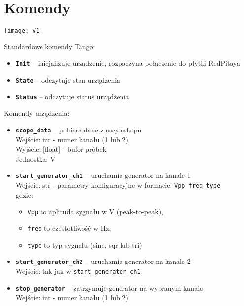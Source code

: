 \documentclass[12pt,a4paper]{article}
\newcommand{\screenshot}[1]{\begin{minipage}[c]{\textwidth}\texttt{[image: \#1]}\end{minipage}}
\begin{document}
	\section{Komendy}
	\screenshot{screenshots/commands.png}
	Standardowe komendy Tango:
	\begin{itemize}
		\item \textbf{\texttt{Init}} -- inicjalizuje urządzenie, rozpoczyna połączenie do płytki RedPitaya
		\item \textbf{\texttt{State}} -- odczytuje stan urządzenia
		\item \textbf{\texttt{Status}} -- odczytuje status urządzenia
	\end{itemize}
	Komendy urządzenia:
	\begin{itemize}
		\item \textbf{\texttt{scope\_data}} -- pobiera dane z oscyloskopu\\
			  Wejście: int - numer kanału (1 lub 2)\\
			  Wyjście: [float] - bufor próbek\\
			  Jednostka: V\\
		\item \textbf{\texttt{start\_generator\_ch1}} -- uruchamia generator na kanale 1\\
			  Wejście: str - parametry konfiguracyjne w formacie: \texttt{Vpp freq type}\\
			  gdzie:
			  \begin{itemize}
			  	\item \texttt{Vpp} to aplituda sygnału w V (peak-to-peak),
			  	\item \texttt{freq} to częstotliwość w Hz,
			  	\item \texttt{type} to typ sygnału (sine, sqr lub tri)
			  \end{itemize}
		\item \textbf{\texttt{start\_generator\_ch2}} -- uruchamia generator na kanale 2\\
			  Wejście: tak jak w \texttt{start\_generator\_ch1}
		\item \textbf{\texttt{stop\_generator}} -- zatrzymuje generator na wybranym kanale\\
			  Wejście: int - numer kanału (1 lub 2)
	\end{itemize}
\end{document}
